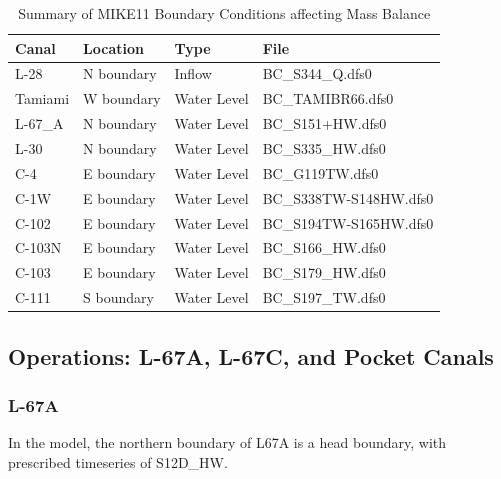 \scriptsize
\begin{table}[!h]
\centering
\caption{Summary of MIKE11 Boundary Conditions affecting Mass Balance}
\label{tab:M11BCfiles}
\begin{tabular}{llll}
\hline
\textbf{Canal}  & \textbf{Location} & \textbf{Type}   & \textbf{File}     \\
\hline
L-28            & N boundary  & Inflow          & BC\_S344\_Q.dfs0 \\
Tamiami            & W boundary  & Water Level     & BC\_TAMIBR66.dfs0 \\
L-67\_A         & N boundary  & Water Level     & BC\_S151+HW.dfs0 \\
L-30            & N boundary  & Water Level     & BC\_S335\_HW.dfs0 \\
C-4             & E boundary  & Water Level     & BC\_G119TW.dfs0 \\
C-1W            & E boundary  & Water Level     & BC\_S338TW-S148HW.dfs0 \\
C-102           & E boundary  & Water Level     & BC\_S194TW-S165HW.dfs0 \\
C-103N          & E boundary  & Water Level     & BC\_S166\_HW.dfs0 \\
C-103           & E boundary  & Water Level     & BC\_S179\_HW.dfs0 \\
C-111           & S boundary  & Water Level     & BC\_S197\_TW.dfs0 \\
\hline
\end{tabular}
\end{table}
\normalsize


\clearpage
\subsection{Operations: L-67A, L-67C, and Pocket Canals}

\subsubsection{L-67A}

In the model, the northern boundary of L67A is a head boundary, with prescribed timeseries of S12D\_HW.


